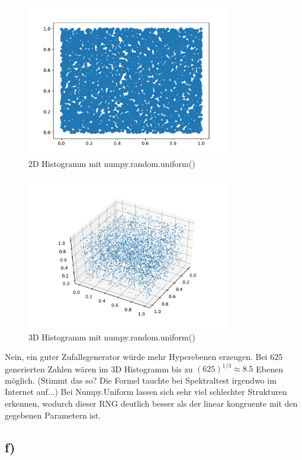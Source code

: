 \begin{figure}[H]
  \centering
  \includegraphics[width=0.8\textwidth]{nr8_d_npuni_2D_seed=0.2.pdf}
  \caption{2D Histogramm mit numpy.random.uniform()}
\end{figure}

\begin{figure}[H]
  \centering
  \includegraphics[width=0.8\textwidth]{nr8_d_npuni_3D_seed=0.2.pdf}
  \caption{3D Histogramm mit numpy.random.uniform()}
\end{figure}


Nein, ein guter Zufallsgenerator würde mehr Hyperebenen erzeugen.
Bei 625 generierten Zahlen wären im 
3D Histogramm bis zu $(625)^{1/3} \approx 8.5$ Ebenen
möglich. (Stimmt das so? Die Formel tauchte bei Spektraltest
irgendwo im Internet auf...)
Bei Numpy.Uniform lassen sich sehr viel schlechter Strukturen erkennen, 
wodurch dieser RNG deutlich besser als der linear kongruente mit 
den gegebenen Parametern ist. 
\subsection{f)}

